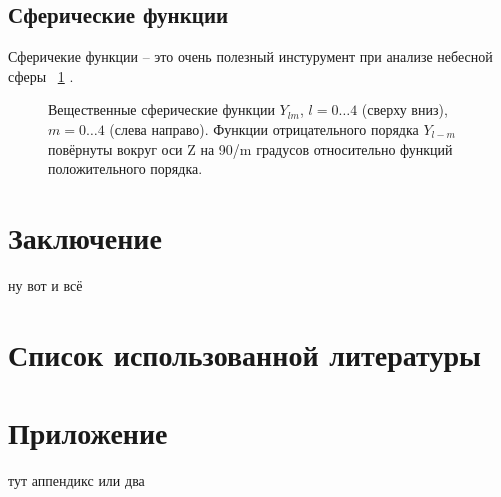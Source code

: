 \documentclass[14pt]{article} %
\begin{document}
\subsection{Сферические функции}\label{sub:smthsf}
Сферичекие функции -- это очень полезный инстурумент при анализе небесной сферы ~\ref{img:sf} .
~\cite{book:sf}






\begin{figure}[h!]
\caption{Вещественные сферические функции $Y_{lm}$, $l=0…4$ (сверху вниз), $m=0…4$ (слева направо). Функции отрицательного порядка $Y_{l-m}$ повёрнуты вокруг оси Z на 90/m градусов относительно функций положительного порядка.}
\label{img:sf}
\end{figure}



\section{Заключение}\label{conclusion}
		ну вот и всё \cite{book:fourier} 

\newpage
\section{Список использованной литературы}\label{conclusionlit}
%
%
\printbibliography[type=online,title={Online only}]
\printbibliography[type=book,title={Статьи:}]


\appendix

\section*{Приложение}
тут аппендикс или два 
\end{document}
